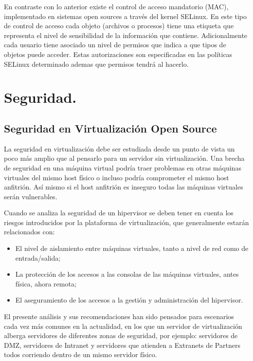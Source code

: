 	En contraste con lo anterior existe el control de acceso mandatorio (MAC), implementado en sistemas open sources a través del kernel SELinux. En este tipo de control de acceso cada objeto (archivos o procesos) tiene una etiqueta que representa el nivel de sensibilidad de la información que contiene. Adicionalmente cada usuario tiene asociado un nivel de permisos que indica a que tipos de objetos puede acceder. Estas autorizaciones son especificadas en las políticas SELinux determinado ademas que permisos tendrá al hacerlo. \cite{5} \newline
		
	\newpage
	\chapter{Seguridad.}
	\section{Seguridad en Virtualización Open Source}
	
	La seguridad en virtualización debe ser estudiada desde un punto de vista un poco más amplio que al pensarlo para un servidor sin virtualización. Una brecha de seguridad en una máquina virtual podría traer problemas en otras máquinas virtuales del mismo host físico o incluso podría comprometer el mismo host anfitrión. Así mismo si el host anfitrión es inseguro todas las máquinas virtuales serán vulnerables. \newline
	
	Cuando se analiza la seguridad de un hipervisor se deben tener en cuenta los riesgos introducidos por la plataforma de virtualización, que generalmente estarán relacionados con:
	
	\begin{itemize}
		\item El nivel de aislamiento entre máquinas virtuales, tanto a nivel de red como de entrada/salida; 
		\item La protección de los accesos a las consolas de las máquinas virtuales, antes física, ahora remota; 
		\item El aseguramiento de los accesos a la gestión y administración del hipervisor.
	\end{itemize}

	El presente análisis y sus recomendaciones han sido pensados para escenarios cada vez más comunes en la actualidad, en los que un servidor de virtualización alberga servidores de diferentes zonas de seguridad, por ejemplo: servidores de DMZ, servidores de Intranet y servidores que atienden a Extranets de Partners todos corriendo dentro de un mismo servidor físico. \newline
	
